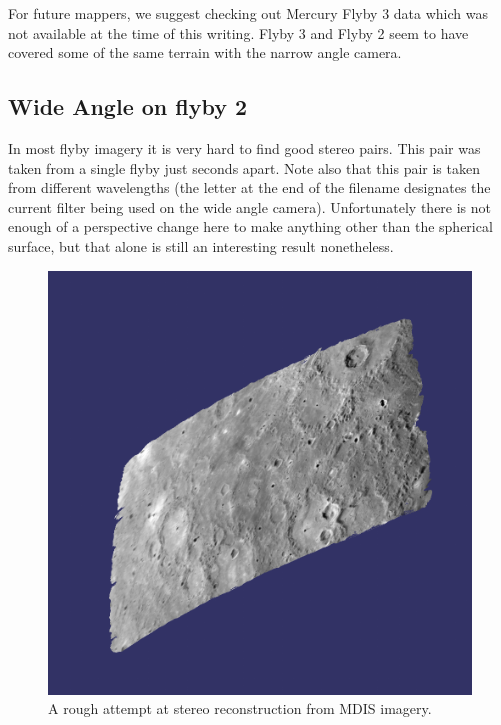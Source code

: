 For future mappers, we suggest checking out Mercury Flyby 3 data which
was not available at the time of this writing. Flyby 3 and Flyby 2
seem to have covered some of the same terrain with the narrow angle
camera.

\subsection{Wide Angle on flyby 2}

In most flyby imagery it is very hard to find good stereo pairs.
This pair was taken from a single flyby just seconds apart. Note
also that this pair is taken from different wavelengths (the letter
at the end of the filename designates the current filter being used
on the wide angle camera). Unfortunately there is not enough of a
perspective change here to make anything other than the spherical
surface, but that alone is still an interesting result nonetheless.

\begin{figure}[h!]
  \begin{center}
  \includegraphics[width=5in]{images/examples/mdis/mdis_wide_example.png}
  \end{center}
  \caption{ A rough attempt at stereo reconstruction from MDIS imagery. }
  \label{fig:mdis_attempt}
\end{figure}

